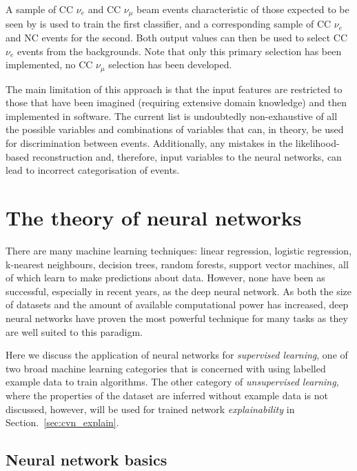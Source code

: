 A sample of CC $\nu_{e}$ and CC $\nu_{\mu}$ beam events characteristic of those expected to be
seen by \chips is used to train the first classifier, and a corresponding sample of CC $\nu_{e}$
and NC events for the second. Both output values can then be used to select CC $\nu_{e}$ events
from the backgrounds. Note that only this primary selection has been implemented, no CC
$\nu_{\mu}$ selection has been developed.

The main limitation of this approach is that the input features are restricted to those that have
been imagined (requiring extensive domain knowledge) and then implemented in software. The current
list is undoubtedly non-exhaustive of all the possible variables and combinations of variables
that can, in theory, be used for discrimination between events. Additionally, any mistakes in the
likelihood-based reconstruction and, therefore, input variables to the neural networks, can lead
to incorrect categorisation of events.

\section{The theory of neural networks} %
\label{sec:cvn_theory} %

There are many machine learning techniques: linear regression, logistic regression, k-nearest
neighbours, decision trees, random forests, support vector machines, all of which learn to make
predictions about data. However, none have been as successful, especially in recent years, as the
deep neural network. As both the size of datasets and the amount of available computational power
has increased, deep neural networks have proven the most powerful technique for many tasks as they
are well suited to this paradigm.

Here we discuss the application of neural networks for \emph{supervised learning}, one of two
broad machine learning categories that is concerned with using labelled example data to train
algorithms. The other category of \emph{unsupervised learning}, where the properties of the
dataset are inferred without example data is not discussed, however, will be used for trained
network \emph{explainability} in Section.~\ref{sec:cvn_explain}.

\subsection{Neural network basics} %
\label{sec:cvn_theory_basics} %

